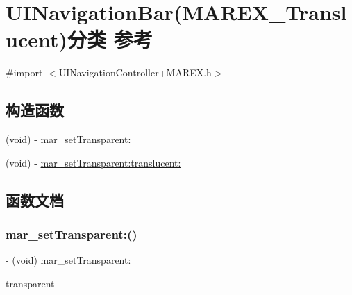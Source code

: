 \hypertarget{category_u_i_navigation_bar_07_m_a_r_e_x___translucent_08}{}\section{U\+I\+Navigation\+Bar(M\+A\+R\+E\+X\+\_\+\+Translucent)分类 参考}
\label{category_u_i_navigation_bar_07_m_a_r_e_x___translucent_08}


{\ttfamily \#import $<$U\+I\+Navigation\+Controller+\+M\+A\+R\+E\+X.\+h$>$}

\subsection*{构造函数}
\begin{DoxyCompactItemize}
\item 
(void) -\/ \hyperlink{category_u_i_navigation_bar_07_m_a_r_e_x___translucent_08_afe2480a72efb113ba4af0ab8ed5335bc}{mar\+\_\+set\+Transparent\+:}
\item 
(void) -\/ \hyperlink{category_u_i_navigation_bar_07_m_a_r_e_x___translucent_08_ae14877af0ed05f498385042a3c4b2f33}{mar\+\_\+set\+Transparent\+:translucent\+:}
\end{DoxyCompactItemize}


\subsection{函数文档}
\mbox{\label{category_u_i_navigation_bar_07_m_a_r_e_x___translucent_08_afe2480a72efb113ba4af0ab8ed5335bc}} 
\subsubsection{\texorpdfstring{mar\+\_\+set\+Transparent\+:()}{mar\_setTransparent:()}}
{\footnotesize\ttfamily -\/ (void) mar\+\_\+set\+Transparent\+: \begin{DoxyParamCaption}\item[{(B\+O\+OL)}]{transparent }\end{DoxyParamCaption}}

